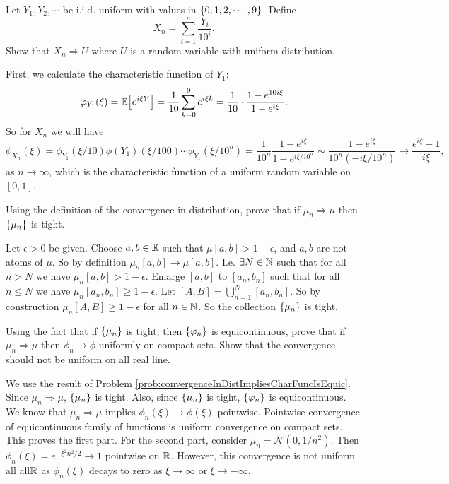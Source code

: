 \begin{problem}
	\label{prob:convergenceToUniformInDist}
	Let $ Y_1,Y_2,\cdots $ be i.i.d. uniform with values in $ \{0,1,2,\cdots,9\} $. Define 
	\[ X_n = \sum_{i=1}^{n} \frac{Y_i}{10^i}. \]
	Show that $ X_n \Rightarrow U $ where $ U $ is a random variable with uniform distribution.
\end{problem}
\begin{solution}
	First, we calculate the characteristic function of $ Y_1 $:
	\[ \varphi_{Y_1}(\xi) = \mathbb{E}\big[e^{i\xi Y}\big] = \frac{1}{10}\sum_{k=0}^{9}e^{i\xi k} = \frac{1}{10}\cdot \frac{1-e^{10 i\xi}}{1 - e^{i\xi}}. \]
	So for $ X_n $ we will have
	\[ \phi_{X_n}(\xi) = \phi_{Y_1}(\xi/10) \phi(Y_1)(\xi/100)\cdots \phi_{Y_1}(\xi/10^n) = \frac{1}{10^n}\frac{1-e^{i\xi}}{1-e^{i\xi/10^n}} \sim \frac{1-e^{i\xi}}{10^n (-i\xi/10^n)} \to \frac{e^{i\xi} - 1}{i\xi}, \]
	as $ n\to\infty $, which is the characteristic function of a uniform random variable on $ [0,1] $.
\end{solution}

\begin{problem}
	\label{prob:convergenceInDistImpliesCharFuncIsEquic}
	Using the definition of the convergence in distribution, prove that if $ \mu_n \Rightarrow \mu $ then $ \{\mu_n\} $ is tight.
\end{problem}
\begin{solution}
	Let $ \epsilon>0 $ be given. Choose $ a,b\in \mathbb{R} $ such that $ \mu[a,b] > 1-\epsilon $, and $ a,b $ are not atoms of $ \mu $. So by definition $ \mu_n[a,b] \to\mu[a,b] $. I.e. $ \exists N\in \mathbb{N} $ such that for all $ n>N $ we have $ \mu_n[a,b] > 1-\epsilon $. Enlarge $ [a,b] $ to $ [a_n , b_n] $ such that for all $ n \leq N $ we have $ \mu_n [a_n,b_n] \geq 1-\epsilon $. Let $ [A,B] = \bigcup_{n=1}^{N} [a_n,b_n] $. So by construction $ \mu_n [A,B] \geq 1- \epsilon $ for all $ n\in \mathbb{N} $. So the collection $ \{\mu_n\} $ is tight.
\end{solution}

\begin{problem}
	Using the fact that if $ \{\mu_n\} $ is tight, then $ \{\varphi_n\} $ is equicontinuous, prove that if $ \mu_n \Rightarrow \mu $ then $ \phi_n \to \phi $ uniformly on compact sets. Show that the convergence should not be uniform on all real line.
\end{problem}
\begin{solution}
	We use the result of Problem \autoref{prob:convergenceInDistImpliesCharFuncIsEquic}. Since $ \mu_n \Rightarrow \mu $, $ \{\mu_n\} $ is tight. Also, since $ \{\mu_n\} $ is tight, $ \{\varphi_n\} $ is equicontinuous. We know that $ \mu_n \Rightarrow \mu $ implies $ \phi_n(\xi) \to \phi(\xi) $ pointwise. Pointwise convergence of equicontinuous family of functions is uniform convergence on compact sets. This proves the first part. For the second part, consider $ \mu_n = \mathcal{N}(0,1/n^2) $. Then $ \phi_n(\xi) = e^{-\xi^2 n^2/2} \to 1 $ pointwise on $ \mathbb{R} $. However, this convergence is not uniform all all$ \mathbb{R} $ as $ \phi_n (\xi) $ decays to zero as $ \xi \to \infty $ or $ \xi \to -\infty $.
\end{solution}

